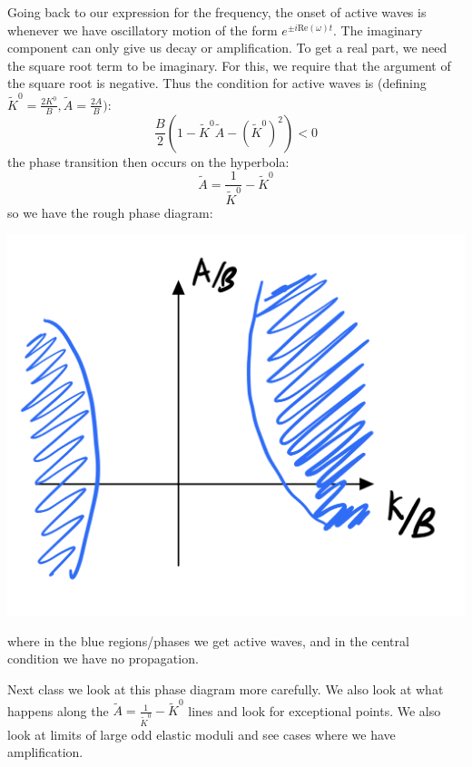 Going back to our expression for the frequency, the onset of active waves is whenever we have oscillatory motion of the form $e^{\pm i \text{Re}(\omega)t}$. The imaginary component can only give us decay or amplification. To get a real part, we need the square root term to be imaginary. For this, we require that the argument of the square root is negative. Thus the condition for active waves is (defining $\tilde{K}^0 = \frac{2K^0}{B}, \tilde{A} = \frac{2A}{B})$:
\begin{equation}
    \frac{B}{2}\left(1 -  \tilde{K}^0 \tilde{A} - \left(\tilde{K}^0\right)^2\right) < 0
\end{equation}
the phase transition then occurs on the hyperbola:
\begin{equation}
    \tilde{A} = \frac{1}{\tilde{K}^0} - \tilde{K}^0
\end{equation}
so we have the rough phase diagram:

\begin{center}
    \includegraphics[scale=0.35]{Lectures/Images/lec5-phasediagram.png}
\end{center}

where in the blue regions/phases we get active waves, and in the central condition we have no propagation.

Next class we look at this phase diagram more carefully. We also look at what happens along the $ \tilde{A} = \frac{1}{\tilde{K}^0} - \tilde{K}^0$ lines and look for exceptional points. We also look at limits of large odd elastic moduli and see cases where we have amplification.